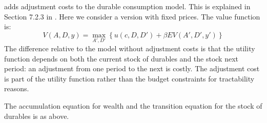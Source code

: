 \documentclass[12pt]{article}
\begin{document}
\citet{bernanke1985adjustment} adds adjustment costs to the durable consumption model. This is explained in Section 7.2.3 in \citet{adda2003dynamic}. Here we consider a version with fixed prices. The value function is:
%
\begin{equation}
	V(A, D, y) = \max_{A', D'} \left\{ u(c, D, D') + \beta EV(A', D', y') \right\}
\end{equation}
%
The difference relative to the model without adjustment costs is that the utility function depends on both the current stock of durables and the stock next period: an adjustment from one period to the next is costly. The adjustment cost is part of the utility function rather than the budget constraints for tractability reasons.

The accumulation equation for wealth and the transition equation for the stock of durables is as above.
\end{document}
